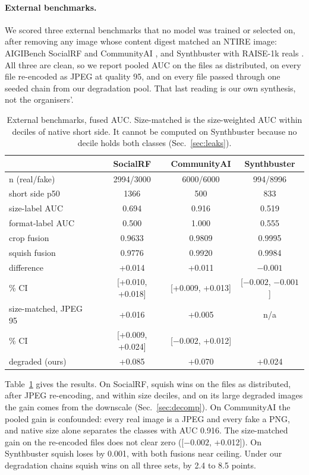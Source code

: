 \documentclass[letterpaper]{article} %
\begin{document}
\paragraph{External benchmarks.} We scored three external benchmarks that no
model was trained or selected on, after removing any image whose content
digest matched an NTIRE image: AIGIBench SocialRF and CommunityAI
\cite{li2025aigibench}, and Synthbuster with RAISE-1k reals
\cite{bammey2024synthbuster,dangnguyen2015raise}. All three are clean, so we
report pooled AUC on the files as distributed, on every file re-encoded as
JPEG at quality 95, and on every file passed through one seeded chain from
our degradation pool. That last reading is our own synthesis, not the
organisers'.

\begin{table}[t]
\centering
\small
\begin{tabular}{lccc}
\toprule
 & SocialRF & CommunityAI & Synthbuster \\
\midrule
n (real/fake) & 2994/3000 & 6000/6000 & 994/8996 \\
short side p50 & 1366 & 500 & 833 \\
size-label AUC & 0.694 & 0.916 & 0.519 \\
format-label AUC & 0.500 & 1.000 & 0.555 \\
\midrule
crop fusion & 0.9633 & 0.9809 & 0.9995 \\
squish fusion & 0.9776 & 0.9920 & 0.9984 \\
difference & +0.014 & +0.011 & $-0.001$ \\
\quad 95\% CI & [+0.010, +0.018] & [+0.009, +0.013] & [$-0.002$, $-0.001$] \\
\midrule
size-matched, JPEG 95 & +0.016 & +0.005 & n/a \\
\quad 95\% CI & [+0.009, +0.024] & [$-0.002$, +0.012] & \\
degraded (ours) & +0.085 & +0.070 & +0.024 \\
\bottomrule
\end{tabular}
\caption{External benchmarks, fused AUC. Size-matched is the size-weighted AUC
within deciles of native short side. It cannot be computed on Synthbuster
because no decile holds both classes (Sec.~\ref{sec:leaks}).}
\label{tab:external}
\end{table}

Table~\ref{tab:external} gives the results. On SocialRF, squish wins on the
files as distributed, after JPEG re-encoding, and within size deciles, and on
its large degraded images the gain comes from the downscale
(Sec.~\ref{sec:decomp}). On CommunityAI the pooled gain is confounded: every
real image is a JPEG and every fake a PNG, and native size alone separates
the classes with AUC 0.916. The size-matched gain on the re-encoded files does
not clear zero ([$-0.002$, +0.012]). On Synthbuster squish loses by 0.001,
with both fusions near ceiling. Under our degradation chains squish wins on
all three sets, by 2.4 to 8.5 points.
\end{document}
